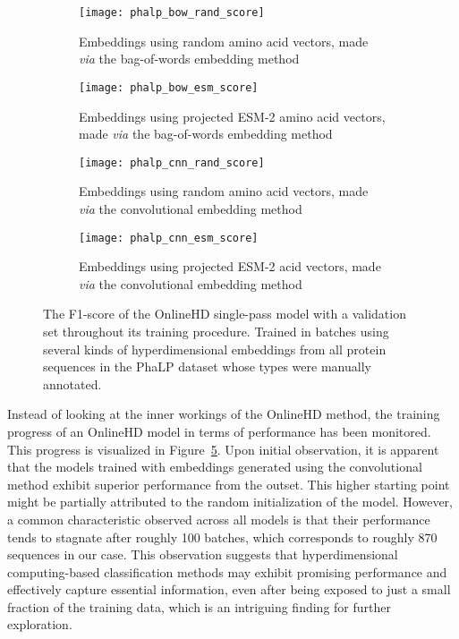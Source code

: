 \begin{figure}[ht!]
    \centering
    \begin{subfigure}{0.48\textwidth}
        \texttt{[image: phalp\_bow\_rand\_score]}
        \caption{Embeddings using random amino acid vectors, made \textit{via} the bag-of-words embedding method}
        \label{fig:subfig-a3}
    \end{subfigure}
    \hfill
    \begin{subfigure}{0.48\textwidth}
        \texttt{[image: phalp\_bow\_esm\_score]}
        \caption{Embeddings using projected ESM-2 amino acid vectors, made \textit{via} the bag-of-words embedding method}
        \label{fig:subfig-b3}
    \end{subfigure}
    
    \begin{subfigure}{0.48\textwidth}
        \texttt{[image: phalp\_cnn\_rand\_score]}
        \caption{Embeddings using random amino acid vectors, made \textit{via} the convolutional embedding method}
        \label{fig:subfig-c3}
    \end{subfigure}
    \hfill
    \begin{subfigure}{0.48\textwidth}
        \texttt{[image: phalp\_cnn\_esm\_score]}
        \caption{Embeddings using projected ESM-2 acid vectors, made \textit{via} the convolutional embedding method}
        \label{fig:subfig-d3}
    \end{subfigure}
    \caption{The F1-score of the OnlineHD single-pass model with a validation set throughout its training procedure. Trained in batches using several kinds of hyperdimensional embeddings from all protein sequences in the PhaLP dataset whose types were manually annotated.}
    \label{fig:main39}
\end{figure}

Instead of looking at the inner workings of the OnlineHD method, the training progress of an OnlineHD model in terms of performance has been monitored. This progress is visualized in Figure~\ref{fig:main39}. Upon initial observation, it is apparent that the models trained with embeddings generated using the convolutional method exhibit superior performance from the outset. This higher starting point might be partially attributed to the random initialization of the model. However, a common characteristic observed across all models is that their performance tends to stagnate after roughly 100 batches, which corresponds to roughly 870 sequences in our case. This observation suggests that hyperdimensional computing-based classification methods may exhibit promising performance and effectively capture essential information, even after being exposed to just a small fraction of the training data, which is an intriguing finding for further exploration.

